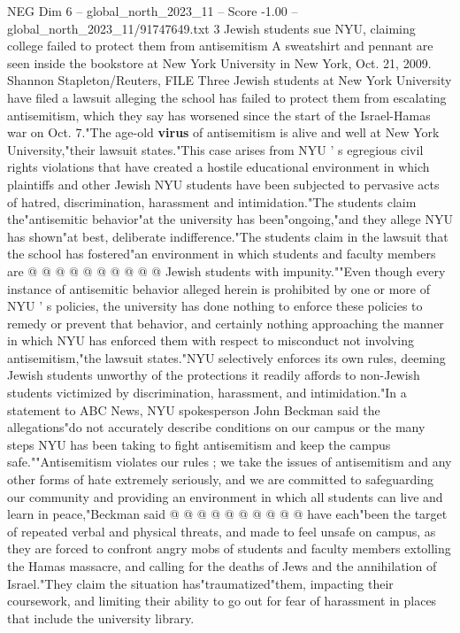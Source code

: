 \begin{textsample}{NEG Dim 6 – global\_north\_2023\_11 – Score -1.00 – global\_north\_2023\_11/91747649.txt}  \label{ex:f6_neg_199}
3 Jewish students sue NYU, claiming college failed to protect them from antisemitism A sweatshirt and pennant are seen inside the bookstore at New York University in New York, Oct. 21, 2009.
Shannon Stapleton/Reuters, FILE Three Jewish students at New York University have filed a lawsuit alleging the school has failed to protect them from escalating antisemitism, which they say has worsened since the start of the Israel-Hamas war on Oct. 7."The age-old \textbf{virus} of antisemitism is alive and well at New York University,"their lawsuit states."This case arises from NYU ' s egregious civil rights violations that have created a hostile educational environment in which plaintiffs and other Jewish NYU students have been subjected to pervasive acts of hatred, discrimination, harassment and intimidation."The students claim the"antisemitic behavior"at the university has been"ongoing,"and they allege NYU has shown"at best, deliberate indifference."The students claim in the lawsuit that the school has fostered"an environment in which students and faculty members are @ @ @ @ @ @ @ @ @ @ Jewish students with impunity.""Even though every instance of antisemitic behavior alleged herein is prohibited by one or more of NYU ' s policies, the university has done nothing to enforce these policies to remedy or prevent that behavior, and certainly nothing approaching the manner in which NYU has enforced them with respect to misconduct not involving antisemitism,"the lawsuit states."NYU selectively enforces its own rules, deeming Jewish students unworthy of the protections it readily affords to non-Jewish students victimized by discrimination, harassment, and intimidation."In a statement to ABC News, NYU spokesperson John Beckman said the allegations"do not accurately describe conditions on our campus or the many steps NYU has been taking to fight antisemitism and keep the campus safe.""Antisemitism violates our rules ; we take the issues of antisemitism and any other forms of hate extremely seriously, and we are committed to safeguarding our community and providing an environment in which all students can live and learn in peace,"Beckman said @ @ @ @ @ @ @ @ @ @ have each"been the target of repeated verbal and physical threats, and made to feel unsafe on campus, as they are forced to confront angry mobs of students and faculty members extolling the Hamas massacre, and calling for the deaths of Jews and the annihilation of Israel."They claim the situation has"traumatized"them, impacting their coursework, and limiting their ability to go out for fear of harassment in places that include the university library.

\end{textsample}
